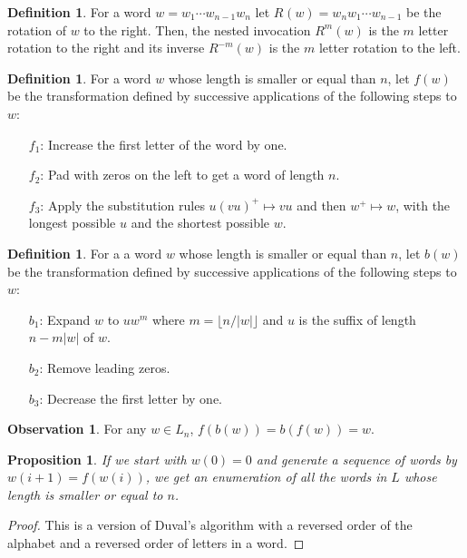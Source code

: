 \documentclass{article}
\newtheorem{proposition}[theorem]{Proposition}
\theoremstyle{definition}
\newtheorem{definition}[theorem]{Definition}
\newtheorem{observation}[theorem]{Observation}
\newcommand{\rr}[2]{R^{#2}({#1})}
\newcommand{\rl}[2]{R^{-{#2}}({#1})}
\begin{document}
\begin{definition}
	For a word $w=w_1\cdots w_{n-1}w_n$ let  $\rr{w}{}= w_{n}w_1\cdots w_{n-1}$ be the rotation of $w$ to the right. Then, the nested invocation $\rr{w}{m}$ is the $m$ letter rotation to the right and its inverse $\rl{w}{m}$ is the $m$ letter rotation to the left.
\end{definition}


\begin{definition}\label{forward}
For a word $w$ whose length is smaller or equal than $n$, let  $f(w)$ be the transformation defined by successive applications of the following steps to $w$:
\begin{enumerate}
	\item[$f_1$:] Increase the first letter of the word by one. 
	\item[$f_2$:] Pad with zeros on the left to get a word of length $n$.
	\item[$f_3$:] Apply the substitution rules $u(vu)^+ \mapsto vu$ and then $w^+ \mapsto w$, with the longest possible $u$ and the shortest possible $w$.
\end{enumerate}
\end{definition}

\begin{definition}\label{backward}
For a a word $w$ whose length is smaller or equal than $n$, let  $b(w)$ be the transformation defined by successive applications of the following steps to $w$:
\begin{enumerate}
	\item[$b_1$:] Expand $w$ to $u w^m$ where $m=\lfloor n/ |w| \rfloor$ and $u$ is the suffix of length $n-m|w|$ of $w$.
	
	\item[$b_2$:] Remove leading zeros.
	\item[$b_3$:] Decrease the first letter by one.
\end{enumerate}
\end{definition}

\begin{observation}
	For any $w\in L_n$, $f(b(w))=b(f(w))=w$.
\end{observation}



\begin{proposition}
	If we start with $w(0)=0$ and generate a sequence of words by $w({i+1})=f(w(i))$, we get an enumeration of all the words in $L$ whose length is smaller or equal to $n$.
\end{proposition}
\begin{proof}
	This is a version of Duval's algorithm with a reversed order of the alphabet and a reversed order of letters in a word. 
\end{proof}
\end{document}
